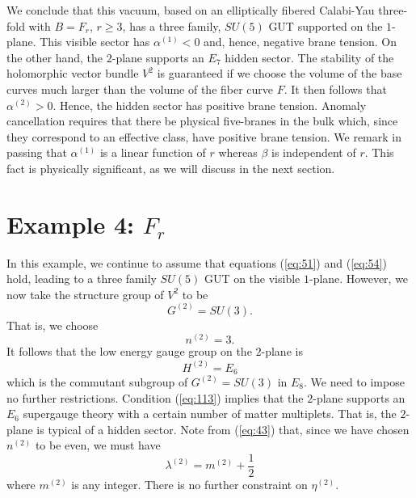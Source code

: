 \documentclass[a4paper,12pt]{article}
\numberwithin{equation}{section}
\theoremstyle{plain}
\begin{document}
We conclude that this vacuum, based on an elliptically fibered Calabi-Yau
three-fold with $B=F_{r}$, $r\geq3$, has a three family, $SU(5)$ GUT supported
on the $1$-plane. This visible sector has $\alpha^{(1)}<0$ and, hence,
negative brane tension. On the other hand, the $2$-plane supports an $E_{7}$
hidden sector. The stability of the holomorphic vector bundle
$V^{2}$ is guaranteed if we choose the volume of the base curves much larger 
than the volume of the fiber curve $F$. It then follows that $\alpha^{(2)}>0$.
Hence, the hidden sector has positive brane tension. Anomaly cancellation 
requires that
there be physical five-branes in the bulk which, since they correspond to an
effective class, have positive brane tension. We remark in passing that
$\alpha^{(1)}$ is a linear function of $r$ whereas $\beta$ is independent of
$r$. This fact is physically significant, as we will discuss in the next
section.

\section*{Example 4: $F_{r}$}

In this example, we continue to assume that equations (\ref{eq:51}) and
(\ref{eq:54}) hold, leading to a three family $SU(5)$ GUT on the visible
$1$-plane. However, we now take the structure group of $V^{2}$ to be
%
\begin{equation}
G^{(2)}=SU(3).
\label{eq:112}
\end{equation}
%
That is, we choose
%
\begin{equation}
n^{(2)}=3.
\label{eq:113}
\end{equation}
%
It follows that the low energy gauge group on the $2$-plane is 
%
\begin{equation}
H^{(2)}=E_{6}
\label{eq:114}
\end{equation}
%
which is the commutant subgroup of $G^{(2)}=SU(3)$ in $E_{8}$. We need to
impose no further restrictions. Condition (\ref{eq:113}) implies that the
$2$-plane supports an $E_{6}$ supergauge theory with a certain number of
matter multiplets. That is, the $2$-plane is typical of a hidden sector. 
Note from (\ref{eq:43}) that, since we have chosen $n^{(2)}$ to be even, we
must have
%
\begin{equation}
\lambda^{(2)}=m^{(2)} +\frac{1}{2}
\label{eq:115}
\end{equation}
%
where $m^{(2)}$ is any integer. There is no further constraint on
$\eta^{(2)}$.
\end{document}

